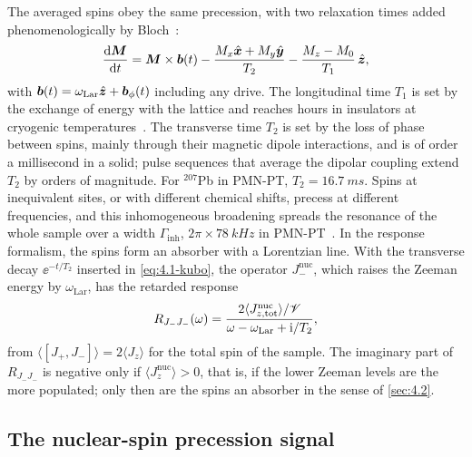 The averaged spins obey the same precession, with two relaxation times added phenomenologically by Bloch~\cite{bloch1946nuclear}:
\begin{equation}
  \frac{\mathrm{d}\bm{M}}{\mathrm{d} t} = \bm{M}\times\bm{b}(t) - \frac{M_x\hat{\bm{x}} + M_y\hat{\bm{y}}}{T_2} - \frac{M_z - M_0}{T_1}\,\hat{\bm{z}} ,
  \label{eq:14.6-bloch}
\end{equation}
with $\bm{b}(t) = \omega_{\mathrm{Lar}}\hat{\bm{z}} + \bm{b}_\phi(t)$ including any drive. The longitudinal time $T_1$ is set by the exchange of energy with the lattice and reaches hours in insulators at cryogenic temperatures~\cite{budker2014proposal}. The transverse time $T_2$ is set by the loss of phase between spins, mainly through their magnetic dipole interactions, and is of order a millisecond in a solid; pulse sequences that average the dipolar coupling extend $T_2$ by orders of magnitude. For $^{207}$Pb in PMN-PT, $T_2 = \SI{16.7}{ms}$. Spins at inequivalent sites, or with different chemical shifts, precess at different frequencies, and this inhomogeneous broadening spreads the resonance of the whole sample over a width $\varGamma_{\mathrm{inh}}$, $2\pi\times\SI{78}{kHz}$ in PMN-PT~\cite[Eqs.~(S24), (S25)]{aybas2021search}. In the response formalism, the spins form an absorber with a Lorentzian line. With the transverse decay $\ee^{-t/T_2}$ inserted in \cref{eq:4.1-kubo}, the operator $J^{\mathrm{nuc}}_-$, which raises the Zeeman energy by $\omega_{\mathrm{Lar}}$, has the retarded response
\begin{equation*}
  R_{J_-J_-}(\omega) = \frac{2\langle J^{\mathrm{nuc}}_{z,\mathrm{tot}}\rangle/\mathscr{V}}{\omega - \omega_{\mathrm{Lar}} + \mathrm{i}/T_2} ,
\end{equation*}
from $\langle[J_+, J_-]\rangle = 2\langle J_z\rangle$ for the total spin of the sample. The imaginary part of $R_{J_-J_-}$ is negative only if $\langle J^{\mathrm{nuc}}_z\rangle > 0$, that is, if the lower Zeeman levels are the more populated; only then are the spins an absorber in the sense of \cref{sec:4.2}.

\subsection{The nuclear-spin precession signal}\label{sec:14.6-signal}

